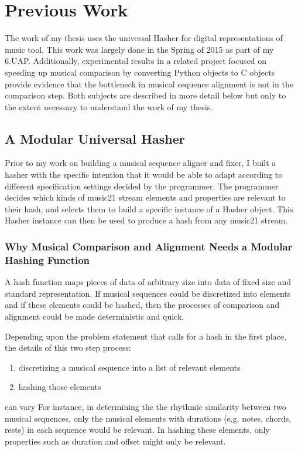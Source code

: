 \chapter{Previous Work}

The work of my thesis uses the universal Hasher for digital representations of music tool. This work was largely done in the Spring of 2015 as part of my 6.UAP. Additionally, experimental results in a related project focused on speeding up musical comparison by converting Python objects to C objects provide evidence that the bottleneck in musical sequence alignment is not in the comparison step. Both subjects are described in more detail below but only to the extent necessary to understand the work of my thesis.

\section{A Modular Universal Hasher} \label{hasher}
Prior to my work on building a musical sequence aligner and fixer, I built a hasher with the specific intention that it would be able to adapt according to different specification settings decided by the programmer. The programmer decides which kinds of music21 stream elements and properties are relevant to their hash, and selects them to build a specific instance of a Hasher object. This Hasher instance can then be used to produce a hash from any music21 stream. 

\subsection{Why Musical Comparison and Alignment Needs a Modular Hashing Function}
A hash function maps pieces of data of arbitrary size into data of fixed size and standard representation. If musical sequences could be discretized into elements and if these elements could be hashed, then the processes of comparison and alignment could be made deterministic and quick. 

Depending upon the problem statement that calls for a hash in the first place, the details of this two step process:
\begin{enumerate}
\item discretizing a musical sequence into a list of relevant elements
\item hashing those elements  
\end{enumerate}
can vary For instance, in determining the the rhythmic similarity between two musical sequences, only the musical elements with durations (e.g. notes, chords, rests) in each sequence would be relevant. In hashing these elements, only properties such as duration and offset might only be relevant. 

